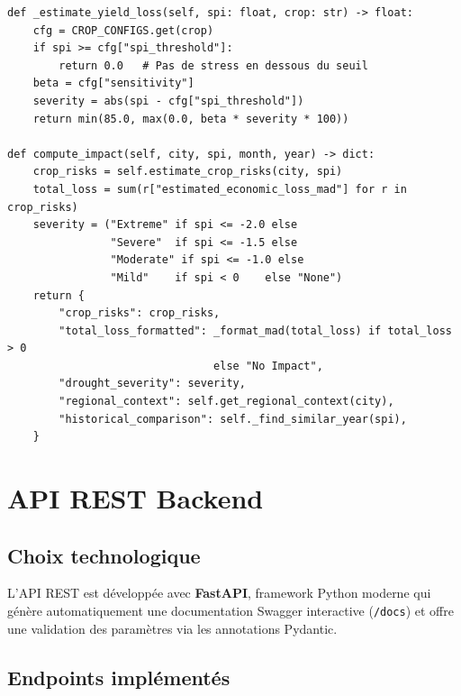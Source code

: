 \documentclass[12pt,a4paper]{report}
\begin{document}
\begin{lstlisting}[style=pythonStyle, caption={Extrait de impact\_engine.py — calcul de l'impact par culture}]
def _estimate_yield_loss(self, spi: float, crop: str) -> float:
    cfg = CROP_CONFIGS.get(crop)
    if spi >= cfg["spi_threshold"]:
        return 0.0   # Pas de stress en dessous du seuil
    beta = cfg["sensitivity"]
    severity = abs(spi - cfg["spi_threshold"])
    return min(85.0, max(0.0, beta * severity * 100))

def compute_impact(self, city, spi, month, year) -> dict:
    crop_risks = self.estimate_crop_risks(city, spi)
    total_loss = sum(r["estimated_economic_loss_mad"] for r in crop_risks)
    severity = ("Extreme" if spi <= -2.0 else
                "Severe"  if spi <= -1.5 else
                "Moderate" if spi <= -1.0 else
                "Mild"    if spi < 0    else "None")
    return {
        "crop_risks": crop_risks,
        "total_loss_formatted": _format_mad(total_loss) if total_loss > 0
                                else "No Impact",
        "drought_severity": severity,
        "regional_context": self.get_regional_context(city),
        "historical_comparison": self._find_similar_year(spi),
    }
\end{lstlisting}

\chapter{API REST Backend}

\section{Choix technologique}

L'API REST est développée avec \textbf{FastAPI}, framework Python moderne qui génère automatiquement une documentation Swagger interactive (\texttt{/docs}) et offre une validation des paramètres via les annotations Pydantic.

\section{Endpoints implémentés}
\end{document}
